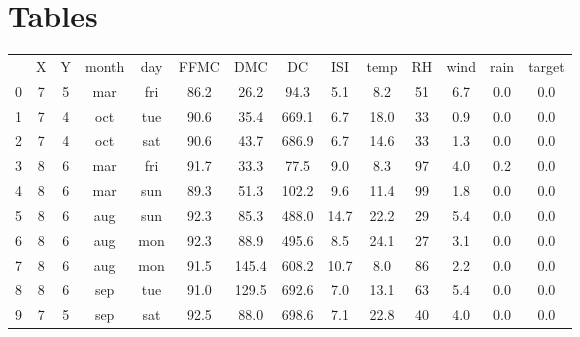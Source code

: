 \section{Tables}
\begin{tabular}{ |c|c|c|c|c|c|c|c|c|c|c|c|c|c| }
\hline
& X & Y & month & day & FFMC & DMC & DC & ISI & temp & RH & wind & rain & target \\
0 & 7 & 5 & mar & fri & 86.2 & 26.2 & 94.3 & 5.1 & 8.2 & 51 & 6.7 & 0.0 & 0.0 \\
1 & 7 & 4 & oct & tue & 90.6 & 35.4 & 669.1 & 6.7 & 18.0 & 33 & 0.9 & 0.0 & 0.0 \\
2 & 7 & 4 & oct & sat & 90.6 & 43.7 & 686.9 & 6.7 & 14.6 & 33 & 1.3 & 0.0 & 0.0 \\
3 & 8 & 6 & mar & fri & 91.7 & 33.3 & 77.5  & 9.0 &  8.3 & 97 & 4.0 & 0.2 & 0.0 \\
4 & 8 & 6 & mar & sun & 89.3 & 51.3 & 102.2 & 9.6 & 11.4 & 99 & 1.8 & 0.0 & 0.0 \\
5 & 8 & 6 & aug & sun & 92.3 & 85.3 & 488.0 & 14.7 & 22.2 & 29 & 5.4 & 0.0 & 0.0 \\
6 & 8 & 6 & aug & mon & 92.3 & 88.9 & 495.6 & 8.5 & 24.1 & 27 & 3.1 & 0.0 & 0.0 \\
7 & 8 & 6 & aug & mon & 91.5 & 145.4 & 608.2 & 10.7 & 8.0 & 86 & 2.2 & 0.0 & 0.0 \\
8 & 8 & 6 & sep & tue & 91.0 & 129.5 & 692.6 & 7.0 & 13.1 & 63 & 5.4 & 0.0 & 0.0 \\
9 & 7 & 5 & sep & sat & 92.5 &  88.0 & 698.6 & 7.1 & 22.8 & 40 & 4.0 & 0.0 & 0.0 \\
\hline
\end{tabular}